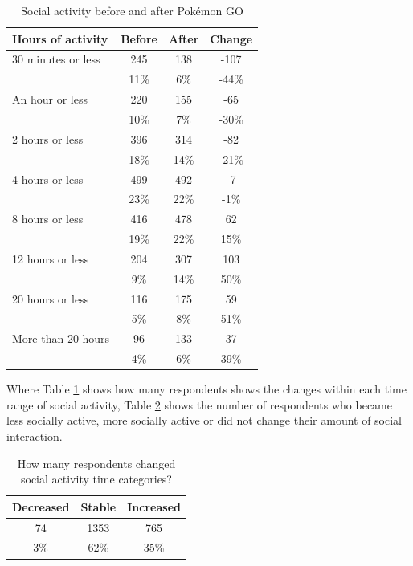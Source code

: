 \begin{table}[h]
	\centering
	\caption{Social activity before and after Pokémon GO}
	\label{tbl:social-activity-before-and-after}
	\begin{tabular}{|l|c|c|c|}
		\hline
		\textbf{Hours of activity} & \textbf{Before} & \textbf{After} & \textbf{Change} \\\hline\hline
		30 minutes or less	& 245 & 138 & -107\\
		& 11\% & 6\% & -44\%\\\hline
		An hour or less & 220 & 155 & -65\\
		& 10\% & 7\% & -30\%\\\hline
		2 hours or less & 396 & 314 & -82\\
		& 18\% & 14\% & -21\%\\\hline
		4 hours or less & 499 & 492 & -7\\
		& 23\% & 22\% & -1\%\\\hline
		8 hours or less & 416 & 478 & 62\\
		& 19\% & 22\% & 15\%\\\hline
		12 hours or less	& 204 & 307 & 103\\
		& 9\% & 14\% & 50\%\\\hline
		20 hours or less	& 116 & 175 & 59\\
		& 5\% & 8\% & 51\%\\\hline
		More than 20 hours	& 96 & 133 & 37\\
		& 4\% & 6\% & 39\%\\\hline
	\end{tabular}
\end{table}

Where Table \ref{tbl:social-activity-before-and-after} shows how many respondents shows the changes within each time range of social activity, Table \ref{tbl:social-activity-change-or-stable} shows the number of respondents who became less socially active, more socially active or did not change their amount of social interaction.

\begin{table}[h]
	\centering
	\caption{How many respondents changed social activity time categories?}
	\label{tbl:social-activity-change-or-stable}
	\begin{tabular}{|c|c|c|}
		\hline
		\textbf{Decreased} & \textbf{Stable} & \textbf{Increased}\\\hline\hline
		74		& 1353		& 765\\
		3\%		& 62\%		& 35\%\\\hline
	\end{tabular}
\end{table}

